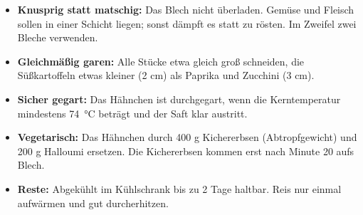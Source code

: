 \documentclass[11pt,a4paper]{article}
\begin{document}
\begin{tcolorbox}[colback=creme, colframe=blatt, boxrule=0.6pt, arc=2pt, left=8pt, right=8pt, top=5pt, bottom=5pt,
  title={\sffamily\bfseries Tipps}, fonttitle=\sffamily, coltitle=white, colbacktitle=blatt]
\begin{itemize}[leftmargin=1.3em, itemsep=0.2em]
  \item \textbf{Knusprig statt matschig:} Das Blech nicht überladen. Gemüse und Fleisch sollen in einer Schicht liegen;
        sonst dämpft es statt zu rösten. Im Zweifel zwei Bleche verwenden.
  \item \textbf{Gleichmäßig garen:} Alle Stücke etwa gleich groß schneiden, die Süßkartoffeln etwas kleiner (2 cm) als
        Paprika und Zucchini (3 cm).
  \item \textbf{Sicher gegart:} Das Hähnchen ist durchgegart, wenn die Kerntemperatur mindestens \qty{74}{\celsius} beträgt
        und der Saft klar austritt.
  \item \textbf{Vegetarisch:} Das Hähnchen durch 400 g Kichererbsen (Abtropfgewicht) und 200 g Halloumi ersetzen. Die
        Kichererbsen kommen erst nach Minute 20 aufs Blech.
  \item \textbf{Reste:} Abgekühlt im Kühlschrank bis zu 2 Tage haltbar. Reis nur einmal aufwärmen und gut durcherhitzen.
\end{itemize}
\end{tcolorbox}
\end{document}
